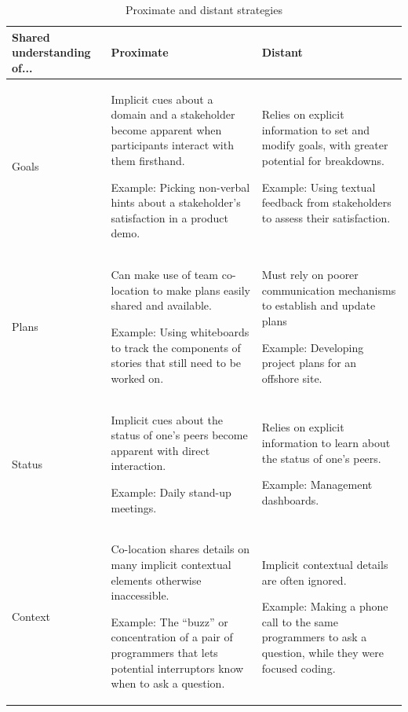 \begin{table}[tbp]
\caption{\label{tab:Proximity} Proximate and distant strategies}
\centering
\footnotesize{\begin{tabular}{p{2.0cm}p{5.8cm}p{5.8cm}}
\hline \hline
\vspace{1pt} \bfseries Shared understanding of... & \vspace{1pt} \bfseries Proximate & \vspace{1pt} \bfseries Distant \\
\hline
\vspace{0.5pt} Goals & \vspace{0.5pt} Implicit cues about a domain and a stakeholder become apparent when participants interact with them firsthand. \par Example: Picking non-verbal hints about a stakeholder's satisfaction in a product demo. & \vspace{0.5pt} Relies on explicit information to set and modify goals, with greater potential for breakdowns. \par Example: Using textual feedback from stakeholders to assess their satisfaction.\\
\hline
\vspace{0.5pt} Plans & \vspace{0.5pt} Can make use of team co-location to make plans easily shared and available. \par Example: Using whiteboards to track the components of stories that still need to be worked on. & \vspace{0.5pt} Must rely on poorer communication mechanisms to establish and update plans \par Example: Developing project plans for an offshore site.\\
\hline
\vspace{0.5pt} Status & \vspace{0.5pt} Implicit cues about the status of one's peers become apparent with direct interaction. \par Example: Daily stand-up meetings. & \vspace{0.5pt} Relies on explicit information to learn about the status of one's peers. \par Example: Management dashboards.\\
\hline
\vspace{0.5pt} Context & \vspace{0.5pt} Co-location shares details on many implicit contextual elements otherwise inaccessible. \par Example: The ``buzz'' or concentration of a pair of programmers that lets potential interruptors know when to ask a question. & \vspace{0.5pt} Implicit contextual details are often ignored. \par Example: Making a phone call to the same programmers to ask a question, while they were focused coding.\\
\hline
\end{tabular}}
\end{table}

